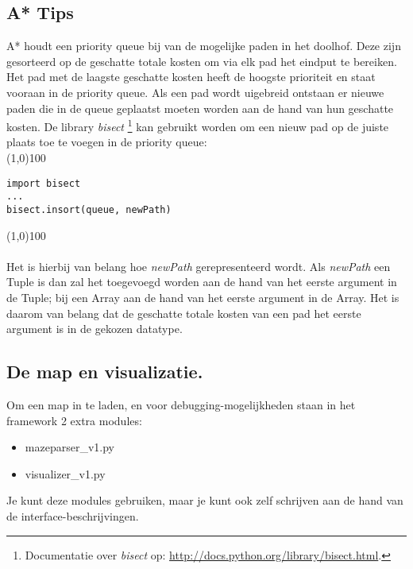 \documentclass[a4paper]{article}
\begin{document}
\subsection{A* Tips}
A* houdt een priority queue bij van de mogelijke paden in het doolhof. Deze zijn gesorteerd op de geschatte totale kosten om via elk pad het eindput te bereiken. Het pad met de laagste geschatte kosten heeft de hoogste prioriteit en staat vooraan in de priority queue. Als een pad wordt uigebreid ontstaan er nieuwe paden die in de queue geplaatst moeten worden aan de hand van hun geschatte kosten. De library \textit{bisect} \footnote{Documentatie over \textit{bisect} op: \url{http://docs.python.org/library/bisect.html}.} kan gebruikt worden om een nieuw pad op de juiste plaats toe te voegen in de priority queue:\\
\noindent \line(1,0){100}
\begin{verbatim}
import bisect
...
bisect.insort(queue, newPath)
\end{verbatim}
\noindent \line(1,0){100}
\\\\
Het is hierbij van belang hoe \textit{newPath} gerepresenteerd wordt. Als \textit{newPath} een Tuple is dan zal het toegevoegd worden aan de hand van het eerste argument in de Tuple; bij een Array aan de hand van het eerste argument in de Array. Het is daarom van belang dat de geschatte totale kosten van een pad het eerste argument is in de gekozen datatype. 

\subsection{De map en visualizatie.}
Om een map in te laden, en voor debugging-mogelijkheden staan in het framework 2 extra modules:
\begin{itemize}
\item mazeparser\_v1.py
\item visualizer\_v1.py
\end{itemize}

Je kunt deze modules gebruiken, maar je kunt ook zelf schrijven aan de hand van de interface-beschrijvingen.
\end{document}
